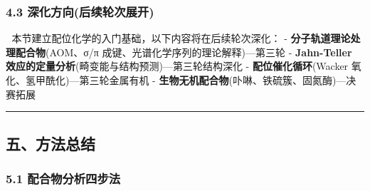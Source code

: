 \subsubsection{4.3 深化方向(后续轮次展开)}\label{ux6df1ux5316ux65b9ux5411ux540eux7eedux8f6eux6b21ux5c55ux5f00}

🔷 本节建立配位化学的入门基础，以下内容将在后续轮次深化：
- \textbf{分子轨道理论处理配合物}(AOM、σ/π 成键、光谱化学序列的理论解释)---第三轮
- \textbf{Jahn-Teller 效应的定量分析}(畸变能与结构预测)---第三轮结构深化
- \textbf{配位催化循环}(Wacker 氧化、氢甲酰化)---第三轮金属有机
- \textbf{生物无机配合物}(卟啉、铁硫簇、固氮酶)---决赛拓展

\begin{center}\rule{0.5\linewidth}{0.5pt}\end{center}

\subsection{五、方法总结}\label{ux4e94ux65b9ux6cd5ux603bux7ed3}

\subsubsection{5.1 配合物分析四步法}\label{ux914dux5408ux7269ux5206ux6790ux56dbux6b65ux6cd5}

\begin{Shaded}
\begin{Highlighting}[]
\end{Highlighting}
\end{Shaded}

